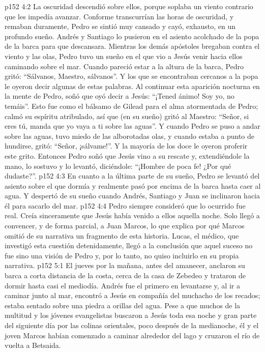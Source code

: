 \vs p152 4:2 La oscuridad descendió sobre ellos, porque soplaba un viento contrario que les impedía avanzar. Conforme transcurrían las horas de oscuridad, y remaban duramente, Pedro se sintió muy cansado y cayó, exhausto, en un profundo sueño. Andrés y Santiago lo pusieron en el asiento acolchado de la popa de la barca para que descansara. Mientras los demás apóstoles bregaban contra el viento y las olas, Pedro tuvo un sueño en el que vio a Jesús venir hacia ellos caminando sobre el mar. Cuando pareció estar a la altura de la barca, Pedro gritó: “Sálvanos, Maestro, sálvanos”. Y los que se encontraban cercanos a la popa le oyeron decir algunas de estas palabras. Al continuar esta aparición nocturna en la mente de Pedro, soñó que oyó decir a Jesús: “¡Tened ánimo! Soy yo, no temáis”. Esto fue como el bálsamo de Gilead para el alma atormentada de Pedro; calmó su espíritu atribulado, así que (en su sueño) gritó al Maestro: “Señor, si eres tú, manda que yo vaya a ti sobre las aguas”. Y cuando Pedro se puso a andar sobre las aguas, tuvo miedo de las alborotadas olas, y cuando estaba a punto de hundirse, gritó: “Señor, ¡sálvame!”. Y la mayoría de los doce le oyeron proferir este grito. Entonces Pedro soñó que Jesús vino a su rescate y, extendiéndole la mano, lo sostuvo y lo levantó, diciéndole: “¡Hombre de poca fe! ¿Por qué dudaste?”.
\vs p152 4:3 En cuanto a la última parte de su sueño, Pedro se levantó del asiento sobre el que dormía y realmente pasó por encima de la barca hasta caer al agua. Y despertó de su sueño cuando Andrés, Santiago y Juan se inclinaron hacia él para sacarlo del mar.
\vs p152 4:4 Pedro siempre consideró que lo ocurrido fue real. Creía sinceramente que Jesús había venido a ellos aquella noche. Solo llegó a convencer, y de forma parcial, a Juan Marcos, lo que explica por qué Marcos omitió de su narrativa un fragmento de esta historia. Lucas, el médico, que investigó esta cuestión detenidamente, llegó a la conclusión que aquel suceso no fue sino una visión de Pedro y, por lo tanto, no quiso incluirlo en su propia narrativa.
\vs p152 5:1 El jueves por la mañana, antes del amanecer, anclaron su barca a corta distancia de la costa, cerca de la casa de Zebedeo y trataron de dormir hasta casi el mediodía. Andrés fue el primero en levantarse y, al ir a caminar junto al mar, encontró a Jesús en compañía del muchacho de los recados; estaba sentado sobre una piedra a orillas del agua. Pese a que muchos de la multitud y los jóvenes evangelistas buscaron a Jesús toda esa noche y gran parte del siguiente día por las colinas orientales, poco después de la medianoche, él y el joven Marcos habían comenzado a caminar alrededor del lago y cruzaron el río de vuelta a Betsaida.
